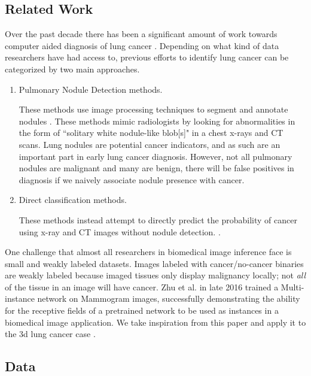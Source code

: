 \documentclass[twocolumn,10pt]{article}
\begin{document}
\subsection{Related Work}
Over the past decade there has been a significant amount of work towards 
computer aided diagnosis of lung cancer \cite{cad_1998}. Depending on what kind
of data researchers have had access to, previous efforts to identify lung cancer
can be categorized by two main approaches. 
\begin{enumerate}


\item Pulmonary Nodule Detection methods. 

These methods use 
image processing techniques to segment and annotate nodules
\cite{FeatureBasedLungNoduleDetection_2017, 
     LungNoduleDetectionWeaklyLabeled_2016, U-net_2015}. These methods
mimic radiologists by looking for abnormalities in the form of
``solitary white nodule-like blob[s]" in a chest x-rays and CT scans.
Lung nodules are potential cancer indicators, and as such are an important part 
in early lung cancer diagnosis. However, not all pulmonary nodules are malignant
and many are benign, there will be false positives in diagnosis if we naively
associate nodule presence with cancer. 

\item Direct classification methods. 

These methods instead attempt to directly predict the probability of cancer using x-ray and
CT images without nodule detection.
\cite{Kuruvilla_2013, classificationOfNodules_2016}. 
\end{enumerate}
One challenge that almost all researchers in biomedical image inference face is 
small and weakly labeled datasets. Images labeled with
cancer/no-cancer binaries are weakly labeled because imaged tissues only display
malignancy locally; not \textit{all} of the tissue in an image will have cancer.
Zhu et al. in late 2016 trained a Multi-instance network on Mammogram images,
successfully demonstrating the ability for the receptive fields of a pretrained 
network to be used as instances in a biomedical image application. We take inspiration
from this paper and apply it to the 3d lung cancer case \cite{DBLP:journals/corr/ZhuLVX16, Maron:1998:FML:302528.302753}. 

\subsection{Data}
\end{document}
